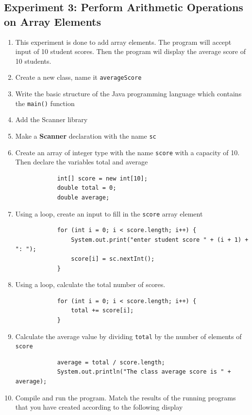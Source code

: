 \documentclass[12pt,titlepage]{article}
\begin{document}
\subsection{Experiment 3: Perform Arithmetic Operations on Array Elements}
\begin{enumerate}
    \item {
        This experiment is done to add array elements. The program will accept input of 10 student scores.
        Then the program wil display the average score of 10 students.
    }
    \item Create a new class, name it \texttt{averageScore}
    \item Write the basic structure of the Java programming language which contains the \texttt{main()} function
    \item Add the Scanner library
    \item Make a \textbf{Scanner} declaration with the name \texttt{sc}
    \item {
        Create an array of integer type with the name \texttt{score} with a capacity of 10.
        Then declare the variables total and average

        \begin{verbatim}
            int[] score = new int[10];
            double total = 0;
            double average;
        \end{verbatim}
    }
    \item {
        Using a loop, create an input to fill in the \texttt{score} array element
        
        \begin{verbatim}
            for (int i = 0; i < score.length; i++) {
                System.out.print("enter student score " + (i + 1) + ": ");
                score[i] = sc.nextInt();
            }
        \end{verbatim}
    }
    \item {
        Using a loop, calculate the total number of scores.

        \begin{verbatim}
            for (int i = 0; i < score.length; i++) {
                total += score[i];
            }
        \end{verbatim}
    }
    \item {
        Calculate the average value by dividing \texttt{total} by the number of elements of \texttt{score}

        \begin{verbatim}
            average = total / score.length;
            System.out.println("The class average score is " + average);
        \end{verbatim}
    }
    \pagebreak
    \item {
        Compile and run the program. Match the results of the running programs that you have created according to the following display

}
\end{enumerate}
\end{document}
